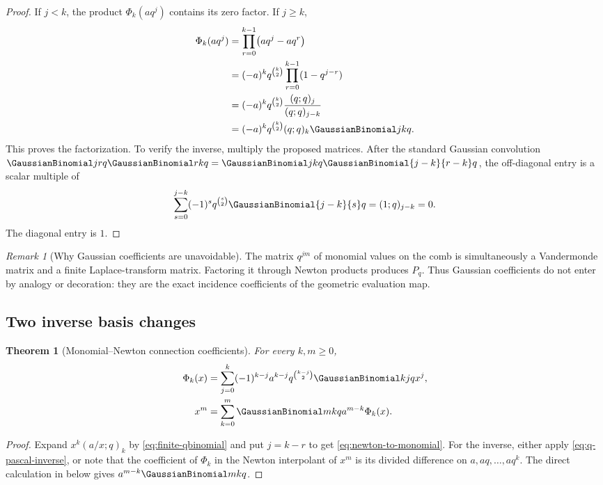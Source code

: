 \documentclass[11pt,a4paper,oneside]{article}
\newtheorem{theorem}{Theorem}[section]
\theoremstyle{definition}
\theoremstyle{remark}
\newtheorem{remark}[remark]{Remark}
\begin{document}
\begin{proof}
If $j<k$, the product $\Phi_k(aq^j)$ contains its zero factor.  If $j\ge k$,
\begin{align*}
 \Phi_k(aq^j)
 &=\prod_{r=0}^{k-1}\bigl(aq^j-aq^r\bigr)\\
 &=(-a)^kq^{\binom k2}
   \prod_{r=0}^{k-1}(1-q^{j-r})\\
 &=(-a)^kq^{\binom k2}\frac{(q;q)_j}{(q;q)_{j-k}}\\
 &=(-a)^kq^{\binom k2}(q;q)_k\GaussianBinomial jkq.
\end{align*}
This proves the factorization.  To verify the inverse, multiply the proposed
matrices.  After the standard Gaussian convolution
\(
 \GaussianBinomial jrq\GaussianBinomial rkq=\GaussianBinomial jkq\GaussianBinomial{j-k}{r-k}q
\), the off-diagonal entry is a scalar multiple of
\[
 \sum_{s=0}^{j-k}(-1)^sq^{\binom s2}\GaussianBinomial{j-k}{s}q
 =(1;q)_{j-k}=0.
\]
The diagonal entry is $1$.
\end{proof}

\begin{remark}[Why Gaussian coefficients are unavoidable]
The matrix $q^{jm}$ of monomial values on the comb is simultaneously a
Vandermonde matrix and a finite Laplace-transform matrix.  Factoring it through
Newton products produces $P_q$.  Thus Gaussian coefficients do not enter by
analogy or decoration: they are the exact incidence coefficients of the
geometric evaluation map.
\end{remark}

\subsection{Two inverse basis changes}

\begin{theorem}[Monomial--Newton connection coefficients]
\label{thm:basis-change}
For every $k,m\ge0$,
\begin{align}
 \Phi_k(x)
 &=\sum_{j=0}^k(-1)^{k-j}a^{k-j}
 q^{\binom{k-j}{2}}\GaussianBinomial kjq x^j,
 \label{eq:newton-to-monomial}\\
 x^m
 &=\sum_{k=0}^m\GaussianBinomial mkq a^{m-k}\Phi_k(x).
 \label{eq:monomial-to-newton}
\end{align}
\end{theorem}

\begin{proof}
Expand $x^k(a/x;q)_k$ by \eqref{eq:finite-qbinomial} and put $j=k-r$ to get
\eqref{eq:newton-to-monomial}.  For the inverse, either apply
\eqref{eq:q-pascal-inverse}, or note that the coefficient of $\Phi_k$ in the
Newton interpolant of $x^m$ is its divided difference on
$a,aq,\ldots,aq^k$.  The direct calculation in 
below gives $a^{m-k}\GaussianBinomial mkq$.
\end{proof}
\end{document}
